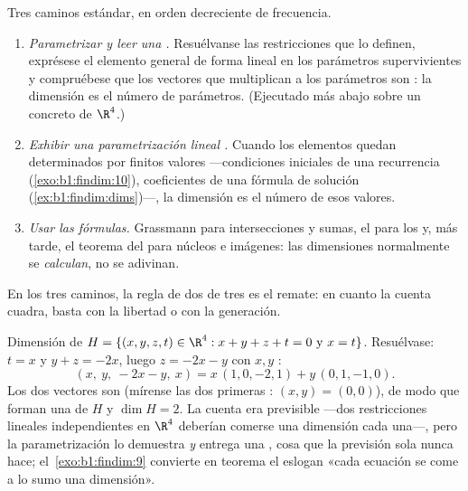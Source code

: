 \begin{method}
\label{met:b1:findim:computedim}
Tres caminos estándar, en orden decreciente de frecuencia.
\begin{enumerate}
  \item \emph{Parametrizar y leer una .} Resuélvanse las
        restricciones que lo definen, exprésese el elemento general
        de forma lineal en los parámetros supervivientes y
        compruébese que los vectores que multiplican a los
        parámetros son : la dimensión es el número de
        parámetros. (Ejecutado más abajo sobre un 
        concreto de $\R^4$.)
  \item \emph{Exhibir una parametrización lineal .} Cuando
        los elementos quedan determinados por finitos valores
        ---condiciones iniciales de una recurrencia
        (\cref{exo:b1:findim:10}), coeficientes de una fórmula de
        solución (\cref{ex:b1:findim:dims})---, la dimensión es el
        número de esos valores.
  \item \emph{Usar las fórmulas.} Grassmann para intersecciones y
        sumas, el  para los  y, más tarde,
        el teorema del  para núcleos e imágenes: las
        dimensiones normalmente se \emph{calculan}, no se adivinan.
\end{enumerate}
En los tres caminos, la regla de dos de tres es el remate: en cuanto
la cuenta cuadra, basta con la libertad o con la generación.
\end{method}

\begin{example}
\label{ex:b1:findim:parametrize}
Dimensión de $H = \{(x, y, z, t) \in \R^4 : x + y + z + t = 0
\text{ y } x = t\}$. Resuélvase: $t = x$ y $y + z = -2x$, luego
$z = -2x - y$ con $x, y$ :
\[
(x,\ y,\ -2x - y,\ x) = x\,(1, 0, -2, 1) + y\,(0, 1, -1, 0) .
\]
Los dos vectores son  (mírense las dos primeras
: $(x, y) = (0,0)$), de modo que forman una  de $H$
y $\dim H = 2$. La cuenta era previsible ---dos restricciones
lineales independientes en $\R^4$ deberían comerse una dimensión cada
una---, pero la parametrización lo demuestra \emph{y} entrega una
, cosa que la previsión sola nunca hace;
el~\cref{exo:b1:findim:9} convierte en teorema el eslogan «cada
ecuación se come a lo sumo una dimensión».
\end{example}

